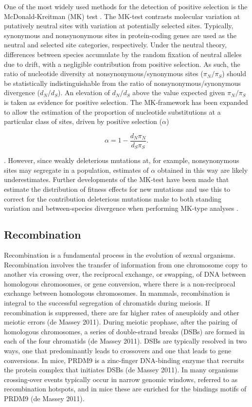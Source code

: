 	One of the most widely used methods for the detection of positive selection is the McDonald-Kreitman (MK) test \citep{RN293}. The MK-test contrasts molecular variation at putatively neutral sites with variation at potentially selected sites. Typically, synonymous and nonsynonymous sites in protein-coding genes are used as the neutral and selected site categories, respectively. Under the neutral theory, differences between species accumulate by the random fixation of neutral  alleles due to drift, with a negligible contribution from positive selection. As such, the ratio of nucleotide diversity at nonsynonymous/synonymous sites ($\pi_N / \pi_S$) should be statistically indistinguishable from the ratio of nonsynonymous/synonymous divergence ($d_N / d_S$). An elevation of $d_N / d_S$ above the value expected given $\pi_N / \pi_S$ is taken as evidence for positive selection. The MK-framework has been expanded to allow the estimation of the proportion of nucleotide substitutions at a particular class of sites, driven by positive selection ($\alpha$)

\begin{equation}
\alpha = 1 - \frac{d_N \pi_N}{d_S \pi_S}.
\end{equation}

\citep{RN294}. However, since weakly deleterious mutations at, for example, nonsynonymous sites may segregate in a population, estimates of $\alpha$ obtained in this way are likely underestimates. Further developments of the MK-test have been made that estimate the distribution of fitness effects for new mutations and use this to correct for the contribution deleterious mutations make to both standing variation and between-species divergence when performing MK-type analyses \citep{RN165}. 

\subsection{Recombination}

	Recombination is a fundamental process in the evolution of sexual organisms. Recombination involves the transfer of information from one chromosome copy to another via crossing over, the reciprocal exchange, or swapping, of DNA between homologous chromosomes, or gene conversion, where there is a non-reciprocal exchange between homologous chromosomes. In mammals, recombination is integral to the successful segregation of chromatids during meiosis. If recombination is suppressed, there are far higher rates of aneuploidy and other meiotic errors (de Massey 2011). During meiotic prophase, after the pairing of homologous chromosomes, a series of double-strand breaks (DSBs) are formed in each of the four chromatids (de Massey 2011). DSBs are typically resolved in two ways, one that predominantly leads to crossovers and one that leads to gene conversions. In mice, PRDM9 is a zinc-finger DNA-binding enzyme that recruits the protein complex that initiates DSBs (de Massey 2011). In many organisms crossing-over events typically occur in narrow genomic windows, referred to as recombination hotspots, and in mice these are enriched for the bindings motifs of PRDM9 (de Massey 2011).

